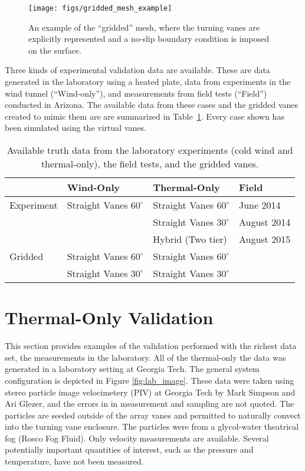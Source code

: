  \begin{figure}[!htb]
   \begin{center}
    \texttt{[image: figs/gridded\_mesh\_example]}
    \caption{An example of the ``gridded'' mesh, where the turning vanes
    are explicitly represented and a no-slip boundary condition is
    imposed on the surface.} 
    \label{fig:gridded_mesh}
   \end{center}
 \end{figure}

Three kinds of experimental validation data are available. These are
data generated in the laboratory using a heated plate, data from
experiments in the wind tunnel (``Wind-only''), and measurements from field
tests (``Field'') conducted in Arizona. The available data from
these cases and the gridded vanes created to mimic them are are
summarized in Table~\ref{tab:val_data}. Every case shown has been
simulated using the virtual vanes.   

\begin{table}[h]
\centering
\label{my-label}
\begin{tabular}{l|l|l|l|}
           & Wind-Only                   & Thermal-Only                & Field  \\
  \hline 
Experiment & Straight Vanes $60^{\circ}$ & Straight Vanes $60^{\circ}$ & June 2014   \\
           &                           & Straight Vanes $30^{\circ}$   & August 2014 \\
           &                           & Hybrid (Two tier)             & August 2015 \\
  \hline 
Gridded    & Straight Vanes $60^{\circ}$ & Straight Vanes $60^{\circ}$ & \\
           & Straight Vanes $30^{\circ}$ & Straight Vanes $30^{\circ}$ & \\
  \hline 
\end{tabular}
  \caption{Available truth data from the laboratory experiments 
    (cold wind and thermal-only), the field tests, and the gridded
 vanes.}  
  \label{tab:val_data}
\end{table}
%
%
%
%
%


%
%
\section{Thermal-Only Validation}
This section provides examples of the validation performed with the
richest data set, the measurements in the laboratory. All of the
thermal-only the data was generated in a laboratory setting at Georgia
Tech. The general system configuration is depicted in Figure
\ref{fig:lab_image}. These data were taken using stereo particle image
velocimetery (PIV) at Georgia Tech by Mark Simpson and Ari Glezer, and
the errors in in measurement and sampling are 
not quoted. The particles are seeded outside of the array vanes and
permitted to naturally convect into the turning vane enclosure. The
particles were from a glycol-water theatrical fog (Rosco Fog Fluid). 
Only velocity measurements are available. Several
potentially important quantities of interest, such as the pressure and
temperature, have not been measured. 

